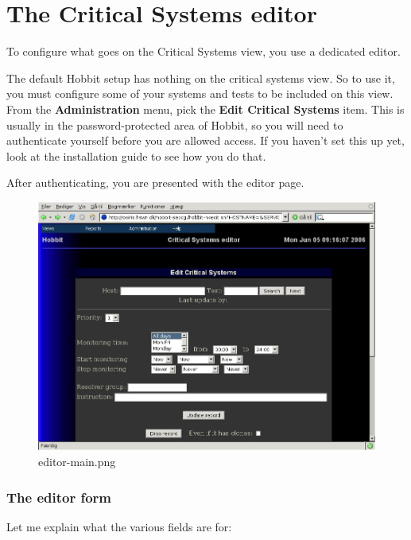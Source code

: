 \section{The Critical Systems editor}


 To configure what goes on the Critical Systems view, you use a
 dedicated editor.



 The default Hobbit setup has nothing on the critical systems view. So
 to use it, you must configure some of your systems and tests to be
 included on this view. From the \textbf{Administration} menu, pick
 the \textbf{Edit Critical Systems} item. This is usually in the
 password-protected area of Hobbit, so you will need to authenticate
 yourself before you are allowed access. If you haven't set this up
 yet, look at the installation guide to see how you do that.



 After authenticating, you are presented with the editor page. 
\begin{figure}
\centering 
\caption{editor-main.png}
\label{editor-main.png}
\includegraphics[scale=0.5]{./editor-main.png} 
\end{figure}

\subsubsection{The editor form} Let me explain what the various fields
are for: 

